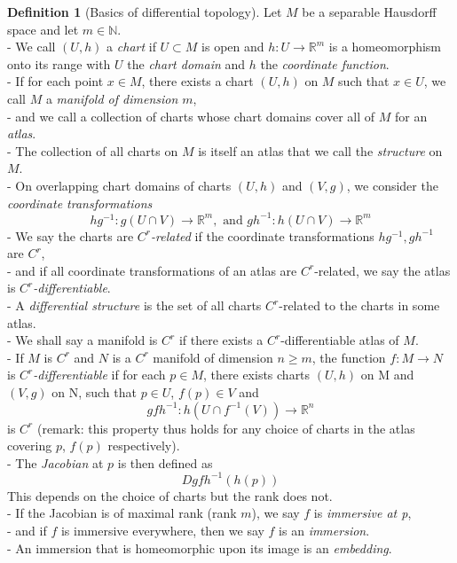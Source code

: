 \documentclass[11pt, a4paper]{memoir}
\theoremstyle{plain}
\theoremstyle{definition}
\newtheorem{defn}{Definition}
\newcommand{\mN}{\mathbb{N}}
\newcommand{\mR}{\mathbb{R}}
\begin{document}
\begin{defn}[Basics of differential topology]
Let $M$ be a separable Hausdorff space and let $m\in \mN$.\\
- We call $(U,h)$ a \emph{chart} if $U\subset M$ is open and $h: U\to \mR^m$ is a homeomorphism onto its range with $U$ the \emph{chart domain} and $h$ the \emph{coordinate function}.\\
- If for each point $x\in M$, there exists a chart $(U,h)$ on $M$ such that $x\in U$, we call $M$ a \emph{manifold of dimension $m$},\\
- and we call a collection of charts whose chart domains cover all of $M$ for an \emph{atlas}.\\
- The collection of all charts on $M$ is itself an atlas that we call the \emph{structure} on $M$.\\
- On overlapping chart domains of charts $(U,h)$ and $(V,g)$, we consider the \emph{coordinate transformations}
$$hg^{-1}: g(U\cap V)\to \mR^m, \text{ and } gh^{-1}: h(U\cap V)\to \mR^m$$
- We say the charts are \emph{$C^r$-related} if the coordinate transformations $hg^{-1}, gh^{-1}$ are $C^r$,\\
- and if all coordinate transformations of an atlas are $C^r$-related, we say the atlas is \emph{$C^r$-differentiable}.\\
- A \emph{differential structure} is the set of all charts $C^r$-related to the charts in some atlas.\\
- We shall say a manifold is $C^r$ if there exists a $C^r$-differentiable atlas of $M$.\\
- If $M$ is $C^r$ and $N$ is a $C^r$ manifold of dimension $n\geq m$, the function $f: M\to N$ is \emph{$C^r$-differentiable} if for each $p\in M$, there exists charts $(U,h)$ on M and $(V,g)$ on N, such that $p\in U$, $f(p)\in V$ and 
$$gfh^{-1}: h(U\cap f^{-1}(V))\to \mR^n$$
is $C^r$ (remark: this property thus holds for any choice of charts in the atlas covering $p$, $f(p)$ respectively).\\
- The \emph{Jacobian} at $p$ is then defined as 
$$Dgfh^{-1}(h(p))$$
This depends on the choice of charts but the rank does not.\\ 
- If the Jacobian is of maximal rank (rank $m$), we say $f$ is \emph{immersive at p},\\
- and if $f$ is immersive everywhere, then we say $f$ is an \emph{immersion}.\\
- An immersion that is homeomorphic upon its image is an \emph{embedding}.\\

\end{defn}
\end{document}

